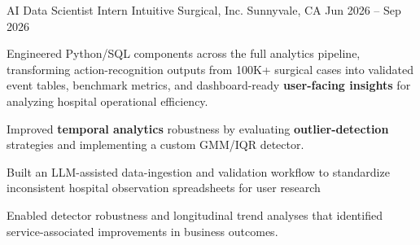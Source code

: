 \documentclass[11pt, a4paper]{awesome-cv}
\begin{document}
\begin{cventries}
  \cventry
    {AI Data Scientist Intern}
    {Intuitive Surgical, Inc.}
    {Sunnyvale, CA}
    {Jun 2026 -- Sep 2026}
    {
      \begin{cvitems}
        \item {Engineered Python/SQL components across the full analytics pipeline, transforming action-recognition outputs from 100K+ surgical cases into validated event tables, benchmark metrics, and dashboard-ready \textbf{user-facing insights} for analyzing hospital operational efficiency.}
        \item {Improved \textbf{temporal analytics} robustness by evaluating \textbf{outlier-detection} strategies and implementing a custom GMM/IQR detector.}
        \item {Built an LLM-assisted data-ingestion and validation workflow to standardize inconsistent hospital observation spreadsheets for user research}
        \item {Enabled detector robustness and longitudinal trend analyses that identified service-associated improvements in business outcomes.}
      \end{cvitems}
    }


\end{cventries}
\end{document}
